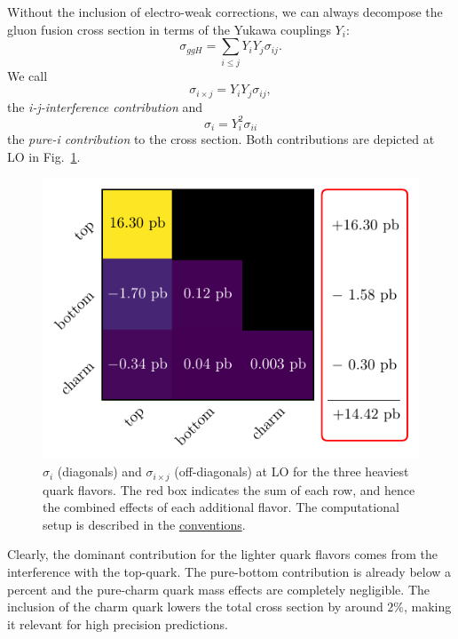 Without the inclusion of electro-weak corrections, we can always decompose the gluon fusion cross section in terms of the Yukawa couplings $Y_i$:
\begin{equation}
\sigma_{ggH} =  \sum_{i\le j} Y_i Y_j \sigma_{i j}.
\end{equation}
We call
\begin{equation}
\sigma_{i \times j} = Y_i Y_j \sigma_{ij},
\end{equation}
the \textit{i-j-interference contribution} and
\begin{equation}
\sigma_{i} = Y_i^2 \sigma_{ii}
\end{equation}
the \textit{pure-i contribution} to the cross section. Both contributions are depicted at \acs{LO} in Fig.~\ref{fig:4:quark_effects}.
\begin{figure}[h]
\centering
\includegraphics[scale=0.9]{Images/quark_effects_LO.pdf}
\caption{$\sigma_{i}$ (diagonals) and $\sigma_{i \times j}$ (off-diagonals) at \acs{LO} for the three heaviest quark flavors. The red box indicates the sum of each row, and hence the combined effects of each additional flavor. The computational setup is described in the \hyperref[chap:notation_and_conventions]{conventions}.}
\label{fig:4:quark_effects}
\end{figure}
Clearly, the dominant contribution for the lighter quark flavors comes from the interference with the top-quark. The pure-bottom contribution is already below a percent and the pure-charm quark mass effects are completely negligible. The inclusion of the charm quark lowers the total cross section by around $2\%$, making it relevant for high precision predictions.


